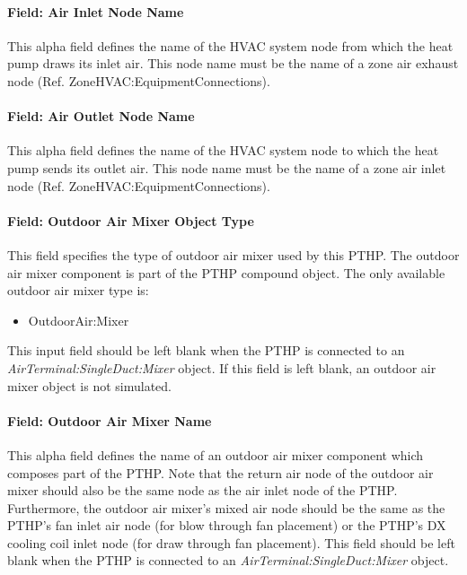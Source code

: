 \paragraph{Field: Air Inlet Node Name}\label{field-air-inlet-node-name-6-000}

This alpha field defines the name of the HVAC system node from which the heat pump draws its inlet air. This node name must be the name of a zone air exhaust node (Ref. ZoneHVAC:EquipmentConnections).

\paragraph{Field: Air Outlet Node Name}\label{field-air-outlet-node-name-6-001}

This alpha field defines the name of the HVAC system node to which the heat pump sends its outlet air. This node name must be the name of a zone air inlet node (Ref. ZoneHVAC:EquipmentConnections).

\paragraph{Field: Outdoor Air Mixer Object Type}\label{field-outdoor-air-mixer-object-type-3}

This field specifies the type of outdoor air mixer used by this PTHP. The outdoor air mixer component is part of the PTHP compound object. The only available outdoor air mixer type is:

\begin{itemize}
\tightlist
\item
  OutdoorAir:Mixer
\end{itemize}

This input field should be left blank when the PTHP is connected to an \textit{AirTerminal:SingleDuct:Mixer} object. If this field is left blank, an outdoor air mixer object is not simulated.

\paragraph{Field: Outdoor Air Mixer Name}\label{field-outdoor-air-mixer-name-3}

This alpha field defines the name of an outdoor air mixer component which composes part of the PTHP. Note that the return air node of the outdoor air mixer should also be the same node as the air inlet node of the PTHP. Furthermore, the outdoor air mixer's mixed air node should be the same as the PTHP's fan inlet air node (for blow through fan placement) or the PTHP's DX cooling coil inlet node (for draw through fan placement). This field should be left blank when the PTHP is connected to an \textit{AirTerminal:SingleDuct:Mixer} object.


